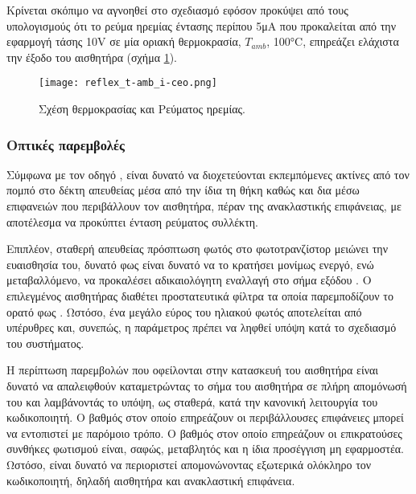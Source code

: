 Κρίνεται σκόπιμο να αγνοηθεί στο σχεδιασμό εφόσον προκύψει από τους υπολογισμούς
ότι το ρεύμα ηρεμίας έντασης περίπου 5μA που προκαλείται από την εφαρμογή
τάσης 10V σε μία οριακή θερμοκρασία, $T_{amb}$, 100°C, επηρεάζει ελάχιστα την
έξοδο του αισθητήρα (σχήμα \ref{fig:reflex:t-amb_i-ceo}).

\begin{figure}
    \caption{Σχέση θερμοκρασίας και Ρεύματος ηρεμίας.
    \label{fig:reflex:t-amb_i-ceo}}
    \begin{center}%
    \texttt{[image: reflex\_t-amb\_i-ceo.png]}
    \end{center}

\end{figure}


\subsubsection{Οπτικές παρεμβολές}

Σύμφωνα με τον οδηγό \textcite{vishay06}, είναι δυνατό να διοχετεύονται
εκπεμπόμενες ακτίνες από τον πομπό στο δέκτη απευθείας μέσα από την ίδια τη θήκη
καθώς και δια μέσω επιφανειών που περιβάλλουν τον αισθητήρα, πέραν της
ανακλαστικής επιφάνειας, με αποτέλεσμα να προκύπτει ένταση ρεύματος συλλέκτη.

Επιπλέον, σταθερή απευθείας πρόσπτωση φωτός στο φωτοτρανζίστορ μειώνει την
ευαισθησία του, δυνατό φως είναι δυνατό να το κρατήσει μονίμως ενεργό, ενώ
μεταβαλλόμενο, να προκαλέσει αδικαιολόγητη εναλλαγή στο σήμα εξόδου
\parencite{vishay06}.
Ο επιλεγμένος αισθητήρας διαθέτει προστατευτικά φίλτρα τα οποία παρεμποδίζουν το
ορατό φως \parencite{vishay09}. Ωστόσο, ένα μεγάλο εύρος του ηλιακού φωτός
αποτελείται από υπέρυθρες και, συνεπώς, η παράμετρος πρέπει να ληφθεί υπόψη κατά
το σχεδιασμό του συστήματος.

Η περίπτωση παρεμβολών που οφείλονται στην κατασκευή του αισθητήρα είναι δυνατό
να απαλειφθούν καταμετρώντας το σήμα του αισθητήρα σε πλήρη απομόνωσή του και
λαμβάνοντάς το υπόψη, ως σταθερά, κατά την κανονική λειτουργία του κωδικοποιητή.
Ο βαθμός στον οποίο επηρεάζουν οι περιβάλλουσες επιφάνειες μπορεί να εντοπιστεί
με παρόμοιο τρόπο. Ο βαθμός στον οποίο επηρεάζουν οι επικρατούσες συνθήκες
φωτισμού είναι, σαφώς, μεταβλητός και η ίδια προσέγγιση μη εφαρμοστέα. Ωστόσο,
είναι δυνατό να περιοριστεί απομονώνοντας εξωτερικά ολόκληρο τον κωδικοποιητή,
δηλαδή αισθητήρα και ανακλαστική επιφάνεια.


